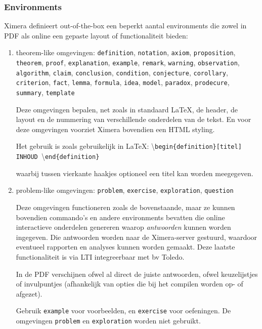 \documentclass{ximera}
\begin{document}
\subsubsection{Environments}

Ximera definieert out-of-the-box een beperkt aantal environments die zowel in PDF als online een gepaste layout of functionaliteit bieden:
\begin{enumerate}
    \item theorem-like omgevingen: \verb|definition|, \verb|notation|, \verb|axiom|, \verb|proposition|, \verb|theorem|, \verb|proof|, \verb|explanation|, \verb|example|, \verb|remark|, \verb|warning|, \verb|observation|, \verb|algorithm|, \verb|claim|, \verb|conclusion|, \verb|condition|, \verb|conjecture|, \verb|corollary|, \verb|criterion|, \verb|fact|, \verb|lemma|, \verb|formula|, \verb|idea|, \verb|model|, \verb|paradox|, \verb|prodecure|, \verb|summary|, \verb|template|
    
    Deze omgevingen bepalen, net zoals in standaard \LaTeX, de header, de layout en de nummering van verschillende onderdelen van de tekst. En voor deze omgevingen voorziet Ximera bovendien een HTML styling.
    
    Het gebruik is zoals gebruikelijk in \LaTeX:
    \textbackslash \verb|begin{definition}[titel] INHOUD |\textbackslash \verb|end{definition}|
    
    waarbij tussen vierkante haakjes optioneel een titel kan worden meegegeven.
    
    \item problem-like omgevingen: \verb|problem|, \verb|exercise|, \verb|exploration|, \verb|question|
    
    Deze omgevingen functioneren zoals de bovenstaande, maar ze kunnen bovendien commando's en andere environments bevatten die online interactieve onderdelen genereren waarop \textit{antwoorden} kunnen worden ingegeven. Die antwoorden worden naar de Ximera-server gestuurd, waardoor eventueel rapporten en analyses kunnen worden gemaakt. Deze laatste functionaliteit is via LTI integreerbaar met bv Toledo.
    
    In de PDF verschijnen ofwel al direct de juiste antwoorden, ofwel keuzelijstjes of invulpuntjes (afhankelijk van opties die bij het compilen worden op- of afgezet).
    
    Gebruik \verb|example| voor voorbeelden, en \verb|exercise| voor oefeningen.
    De omgevingen  \verb|problem| en \verb|exploration| worden niet gebruikt.
     

\end{enumerate}
\end{document}
